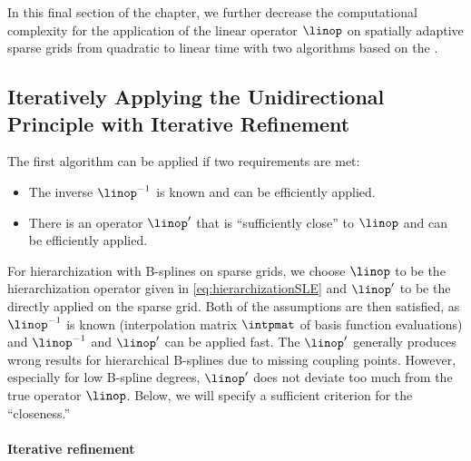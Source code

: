 \label{sec:45spatAdaptiveUP}


\noindent
In this final section of the chapter,
we further decrease the computational complexity
for the application of the linear operator $\linop$
on spatially adaptive sparse grids
from quadratic to linear time with two algorithms based on the \up.



\subsection{%
  Iteratively Applying the Unidirectional Principle with Iterative Refinement%
}
\label{sec:451iterativeRefinement}

The first algorithm can be applied if two requirements are met:
\begin{itemize}
  \item
  The inverse $\linop^{-1}$ is known and can be efficiently applied.
  
  \item
  There is an operator $\linop'$
  that is ``sufficiently close'' to $\linop$ and can be efficiently applied.
\end{itemize}
For hierarchization with B-splines on sparse grids,
we choose $\linop$ to be the hierarchization
operator given in \cref{eq:hierarchizationSLE} and
$\linop'$ to be the \up directly applied on the
sparse grid.
Both of the assumptions are then satisfied,
as $\linop^{-1}$ is known
(interpolation matrix $\intpmat$ of basis function evaluations)
and $\linop^{-1}$ and $\linop'$ can be applied fast.
The \up $\linop'$ generally produces wrong
results for hierarchical B-splines due to missing coupling points.
However, especially for low B-spline degrees,
$\linop'$ does not deviate too much from the true operator $\linop$.
Below, we will specify a sufficient criterion for the ``closeness.''

\paragraph{Iterative refinement}

